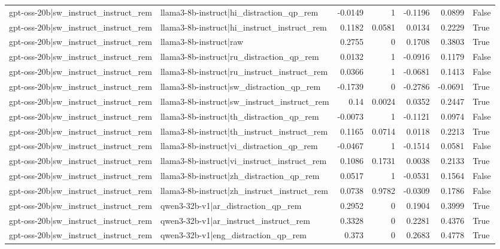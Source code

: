\begin{table}
\begin{tabular}{l l r r r r l}
gpt-oss-20b|sw_instruct_instruct_rem & llama3-8b-instruct|hi_distraction_qp_rem & -0.0149 & 1 & -0.1196 & 0.0899 & False \\
gpt-oss-20b|sw_instruct_instruct_rem & llama3-8b-instruct|hi_instruct_instruct_rem & 0.1182 & 0.0581 & 0.0134 & 0.2229 & True \\
gpt-oss-20b|sw_instruct_instruct_rem & llama3-8b-instruct|raw & 0.2755 & 0 & 0.1708 & 0.3803 & True \\
gpt-oss-20b|sw_instruct_instruct_rem & llama3-8b-instruct|ru_distraction_qp_rem & 0.0132 & 1 & -0.0916 & 0.1179 & False \\
gpt-oss-20b|sw_instruct_instruct_rem & llama3-8b-instruct|ru_instruct_instruct_rem & 0.0366 & 1 & -0.0681 & 0.1413 & False \\
gpt-oss-20b|sw_instruct_instruct_rem & llama3-8b-instruct|sw_distraction_qp_rem & -0.1739 & 0 & -0.2786 & -0.0691 & True \\
gpt-oss-20b|sw_instruct_instruct_rem & llama3-8b-instruct|sw_instruct_instruct_rem & 0.14 & 0.0024 & 0.0352 & 0.2447 & True \\
gpt-oss-20b|sw_instruct_instruct_rem & llama3-8b-instruct|th_distraction_qp_rem & -0.0073 & 1 & -0.1121 & 0.0974 & False \\
gpt-oss-20b|sw_instruct_instruct_rem & llama3-8b-instruct|th_instruct_instruct_rem & 0.1165 & 0.0714 & 0.0118 & 0.2213 & True \\
gpt-oss-20b|sw_instruct_instruct_rem & llama3-8b-instruct|vi_distraction_qp_rem & -0.0467 & 1 & -0.1514 & 0.0581 & False \\
gpt-oss-20b|sw_instruct_instruct_rem & llama3-8b-instruct|vi_instruct_instruct_rem & 0.1086 & 0.1731 & 0.0038 & 0.2133 & True \\
gpt-oss-20b|sw_instruct_instruct_rem & llama3-8b-instruct|zh_distraction_qp_rem & 0.0517 & 1 & -0.0531 & 0.1564 & False \\
gpt-oss-20b|sw_instruct_instruct_rem & llama3-8b-instruct|zh_instruct_instruct_rem & 0.0738 & 0.9782 & -0.0309 & 0.1786 & False \\
gpt-oss-20b|sw_instruct_instruct_rem & qwen3-32b-v1|ar_distraction_qp_rem & 0.2952 & 0 & 0.1904 & 0.3999 & True \\
gpt-oss-20b|sw_instruct_instruct_rem & qwen3-32b-v1|ar_instruct_instruct_rem & 0.3328 & 0 & 0.2281 & 0.4376 & True \\
gpt-oss-20b|sw_instruct_instruct_rem & qwen3-32b-v1|eng_distraction_qp_rem & 0.373 & 0 & 0.2683 & 0.4778 & True \\

\end{tabular}
\end{table}
